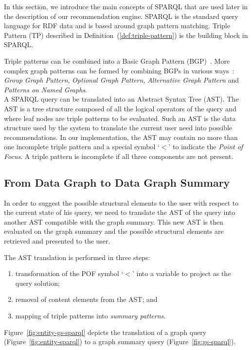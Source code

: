 In this section, we introduce the main concepts of SPARQL that are used later in the description of our recommendation engine. SPARQL is the standard query language for RDF data and is based around graph pattern matching. Triple Pattern (TP) described in Definition~(\ref{def:triple-pattern}) is the building block in SPARQL.

Triple patterns can be combined into a Basic Graph Pattern (BGP)~\cite{PrudS08}. More complex graph patterns can be formed by combining BGPs in various ways~\cite{PrudS08}: \emph{Group Graph Pattern}, \emph{Optional Graph Pattern}, \emph{Alternative Graph Pattern} and \emph{Patterns on Named Graphs}.\\

A SPARQL query can be translated into an Abstract Syntax Tree (AST). The AST is a tree structure composed of all the logical operators of the query and where leaf nodes are triple patterns to be evaluated. Such an AST is the data structure used by the system to translate the current user need into possible recommendations. In our implementation, the AST may contain no more than one incomplete triple pattern and a special symbol `$<$' to indicate the \emph{Point of Focus}. A triple pattern is incomplete if all three components are not present.

\subsection{From Data Graph to Data Graph Summary}

In order to suggest the possible structural elements to the user with respect to the current state of his query, we need to translate the AST of the query into another AST compatible with the graph summary. This new AST is then evaluated on the graph summary and the possible structural elements are retrieved and presented to the user.

The AST translation is performed in three steps:
\begin{enumerate}
	\item transformation of the POF symbol `$<$' into a variable to project as the query solution;
	\item removal of content elements from the AST; and
	\item mapping of triple patterns into \emph{summary patterns}.
\end{enumerate}
Figure~\ref{fig:entity-gs-sparql} depicts the translation of a graph query (Figure~\ref{fig:entity-sparql}) to a graph summary query (Figure~\ref{fig:gs-sparql}).

